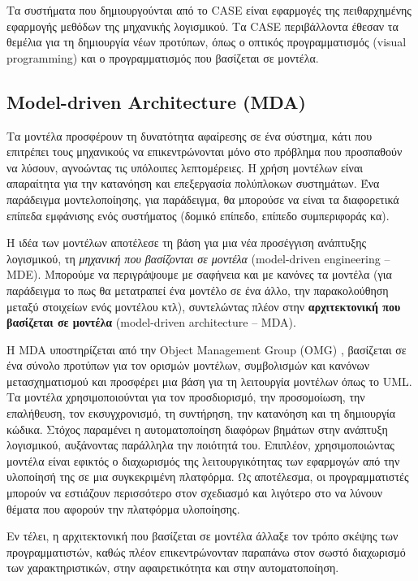             Τα συστήματα που δημιουργούνται από το CASE είναι εφαρμογές της πειθαρχημένης εφαρμογής μεθόδων της μηχανικής λογισμικού.
            Τα CASE περιβάλλοντα έθεσαν τα θεμέλια για τη δημιουργία νέων προτύπων, όπως ο οπτικός προγραμματισμός (visual programming) και ο προγραμματισμός που βασίζεται σε μοντέλα. \cite{CASEChikofsky, Case1985, CASEKuhn, AdoptionCASE}

        \subsection{Model-driven Architecture (MDA)}
            Τα μοντέλα προσφέρουν τη δυνατότητα αφαίρεσης σε ένα σύστημα, κάτι που επιτρέπει τους μηχανικούς να επικεντρώνονται μόνο στο πρόβλημα που προσπαθούν να λύσουν, αγνοώντας τις υπόλοιπες λεπτομέρειες. Η χρήση μοντέλων είναι απαραίτητα για την κατανόηση και επεξεργασία πολύπλοκων συστημάτων. Ένα παράδειγμα μοντελοποίησης, για παράδειγμα, θα μπορούσε να είναι τα διαφορετικά επίπεδα εμφάνισης ενός συστήματος (δομικό επίπεδο, επίπεδο συμπεριφοράς κα).

            Η ιδέα των μοντέλων αποτέλεσε τη βάση για μια νέα προσέγγιση ανάπτυξης λογισμικού, τη \textit{μηχανική που βασίζονται σε μοντέλα} (model-driven engineering -- MDE). Μπορούμε να περιγράψουμε με σαφήνεια και με κανόνες τα μοντέλα (για παράδειγμα το πως θα μετατραπεί ένα μοντέλο σε ένα άλλο, την παρακολούθηση μεταξύ στοιχείων ενός μοντέλου κτλ), συντελώντας πλέον στην \textbf{αρχιτεκτονική που βασίζεται σε μοντέλα} (model-driven architecture -- MDA).

            Η MDA υποστηρίζεται από την Object Management Group (OMG) \cite{OMG_MDA}, βασίζεται σε ένα σύνολο προτύπων για τον ορισμών μοντέλων, συμβολισμών και κανόνων μετασχηματισμού και προσφέρει μια βάση για τη λειτουργία μοντέλων όπως το UML. Τα μοντέλα χρησιμοποιούνται για τον προσδιορισμό, την προσομοίωση, την επαλήθευση, τον εκσυγχρονισμό, τη συντήρηση, την κατανόηση και τη δημιουργία κώδικα. Στόχος παραμένει η αυτοματοποίηση διαφόρων βημάτων στην ανάπτυξη λογισμικού, αυξάνοντας παράλληλα την ποιότητά του. Επιπλέον, χρησιμοποιώντας μοντέλα είναι εφικτός ο διαχωρισμός της λειτουργικότητας των εφαρμογών από την υλοποίησή της σε μια συγκεκριμένη πλατφόρμα. Ως αποτέλεσμα, οι προγραμματιστές μπορούν να εστιάζουν περισσότερο στον σχεδιασμό και λιγότερο στο να λύνουν θέματα που αφορούν την πλατφόρμα υλοποίησης.

            Εν τέλει, η αρχιτεκτονική που βασίζεται σε μοντέλα άλλαξε τον τρόπο σκέψης των προγραμματιστών, καθώς πλέον επικεντρώνονταν παραπάνω στον σωστό διαχωρισμό των χαρακτηριστικών, στην αφαιρετικότητα και στην αυτοματοποίηση.
            \cite{Bucaioni2022, MDELow, MDSDSpringer}

